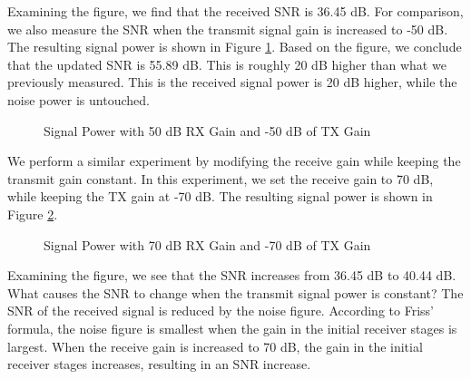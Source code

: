 \documentclass{article}
\begin{document}
Examining the figure, we find that the received SNR is 36.45 dB. For comparison, we also measure the SNR when the transmit signal gain is increased to -50 dB. The resulting signal power is shown in Figure \ref{fig::snr_manual_agc_50db_rx_gain_50db_tx_atten}. Based on the figure, we conclude that the updated SNR is 55.89 dB. This is roughly 20 dB higher than what we previously measured. This is the received signal power is 20 dB higher, while the noise power is untouched.

\begin{figure}[H]
	\centerline{}
	\caption{Signal Power with 50 dB RX Gain and -50 dB of TX Gain}
	\label{fig::snr_manual_agc_50db_rx_gain_50db_tx_atten}
\end{figure}

We perform a similar experiment by modifying the receive gain while keeping the transmit gain constant. In this experiment, we set the receive gain to 70 dB, while keeping the TX gain at -70 dB. The resulting signal power is shown in Figure \ref{fig::snr_manual_agc_70db_rx_gain_70db_tx_atten}.

\begin{figure}[H]
	\centerline{}
	\caption{Signal Power with 70 dB RX Gain and -70 dB of TX Gain}
	\label{fig::snr_manual_agc_70db_rx_gain_70db_tx_atten}
\end{figure}

Examining the figure, we see that the SNR increases from 36.45 dB to 40.44 dB. What causes the SNR to change when the transmit signal power is constant? The SNR of the received signal is reduced by the noise figure. According to Friss' formula, the noise figure is smallest when the gain in the initial receiver stages is largest. When the receive gain is increased to 70 dB, the gain in the initial receiver stages increases, resulting in an SNR increase.
\end{document}
